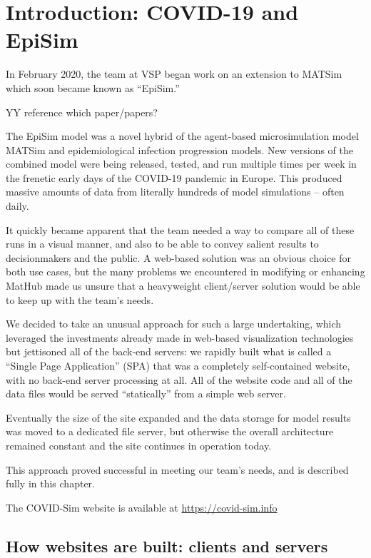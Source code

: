 \hypertarget{introduction-covid-19-and-episim}{%
\section{Introduction: COVID-19 and
EpiSim}\label{introduction-covid-19-and-episim}}

In February 2020, the team at VSP began work on an extension to MATSim which soon became known as ``EpiSim.''

YY reference which paper/papers?

The EpiSim model was a novel hybrid of the agent-based microsimulation model MATSim and epidemiological infection progression models. New versions of the combined model were being released, tested, and run multiple times per week in the frenetic early days of the COVID-19 pandemic in Europe. This produced massive amounts of data from literally hundreds of model simulations -- often daily.

It quickly became apparent that the team needed a way to compare all of these runs in a visual manner, and also to be able to convey salient results to decisionmakers and the public. A web-based solution was an obvious choice for both use cases, but the many problems we encountered in modifying or enhancing MatHub made us unsure that a heavyweight client/server solution would be able to keep up with the team's needs.

We decided to take an unusual approach for such a large undertaking, which leveraged the investments already made in web-based visualization technologies but jettisoned all of the back-end servers: we rapidly built what is called a ``Single Page Application'' (SPA) that was a completely self-contained website, with no back-end server processing at all. All of the website code and all of the data files would be served ``statically'' from a simple web server.

Eventually the size of the site expanded and the data storage for model results was moved to a dedicated file server, but otherwise the overall architecture remained constant and the site continues in operation today.

This approach proved successful in meeting our team's needs, and is described fully in this chapter.

The COVID-Sim website is available at \url{https://covid-sim.info}

\hypertarget{how-websites-are-built-clients-and-servers}{%
\subsection{How websites are built: clients and servers}\label{how-websites-are-built-clients-and-servers}}

